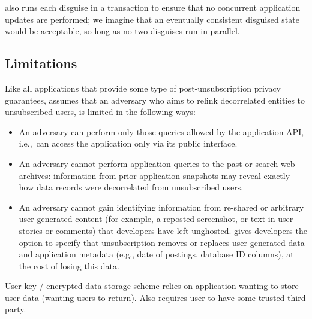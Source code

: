 \sys also runs each disguise in a transaction to ensure that no concurrent application updates are
performed; we imagine that an eventually consistent disguised state would be acceptable, so long as
no two disguises run in parallel.


\iffalse
\subsection{Limitations}

Like all applications that provide some type of post-unsubscription privacy guarantees, \name assumes
that an adversary who aims to relink decorrelated entities to unsubscribed users, is limited in the
following ways:
\begin{itemize}
    \item An adversary can perform only those queries allowed by the application API,
i.e.,\ can access the application only via its public interface.

    \item An adversary cannot perform application queries to the past or search web archives:
    information from prior application snapshots may reveal
    exactly how data records were decorrelated from unsubscribed users.

    \item An adversary cannot gain identifying information from re-shared or arbitrary
        user-generated content (for example, a reposted screenshot, or text in user stories or
        comments) that developers have left unghosted.
        \name gives developers the option to specify that unsubscription removes or replaces
        user-generated data and application metadata (e.g., date of postings, database ID columns),
        at the cost of losing this data.
\end{itemize}

User key / encrypted data storage scheme relies on application wanting to store user data (wanting
users to return). Also requires user to have some trusted third party.

